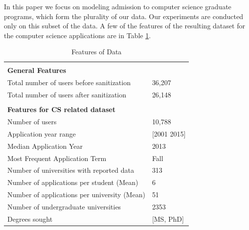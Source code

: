 \documentclass{sig-alternate-05-2015}
\begin{document}
In this paper we focus on modeling admission to computer science graduate programs, which form the plurality of our data. Our experiments are conducted only on this subset of the data. A few of the features of the resulting dataset for the computer science applications are in Table \ref{tab:dataset}.

\begin{table}[]
\centering
\caption{Features of Data}
\label{tab:dataset}
\begin{tabular}{ll}
& \\
\textbf{General Features} & \\
\hline
Total number of users before sanitization & 36,207 \\
Total number of users after sanitization & 26,148 \\
& \\
\textbf{Features for CS related dataset} & \\
\hline
Number of users & 10,788 \\
Application year range & [2001 2015] \\
Median Application Year & 2013 \\
Most Frequent Application Term & Fall \\
Number of universities with reported data & 313 \\
Number of applications per student (Mean) & 6 \\
Number of applications per university (Mean) & 51 \\
Number of undergraduate universities & 2353 \\
Degrees sought & [MS, PhD] \\
\hline
\end{tabular}
\end{table}
\end{document}

